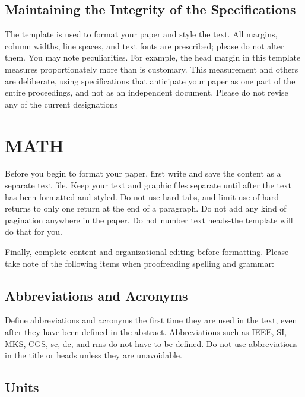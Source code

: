 \documentclass[letterpaper, 10 pt, conference]{ieeeconf}
\begin{document}
\subsection{Maintaining the Integrity of the Specifications}

The template is used to format your paper and style the text. All margins, column widths, line spaces, and text fonts are prescribed; please do not alter them. You may note peculiarities. For example, the head margin in this template measures proportionately more than is customary. This measurement and others are deliberate, using specifications that anticipate your paper as one part of the entire proceedings, and not as an independent document. Please do not revise any of the current designations

\section{MATH}

Before you begin to format your paper, first write and save the content as a separate text file. Keep your text and graphic files separate until after the text has been formatted and styled. Do not use hard tabs, and limit use of hard returns to only one return at the end of a paragraph. Do not add any kind of pagination anywhere in the paper. Do not number text heads-the template will do that for you.

Finally, complete content and organizational editing before formatting. Please take note of the following items when proofreading spelling and grammar:

\subsection{Abbreviations and Acronyms} Define abbreviations and acronyms the first time they are used in the text, even after they have been defined in the abstract. Abbreviations such as IEEE, SI, MKS, CGS, sc, dc, and rms do not have to be defined. Do not use abbreviations in the title or heads unless they are unavoidable.

\subsection{Units}
\end{document}
